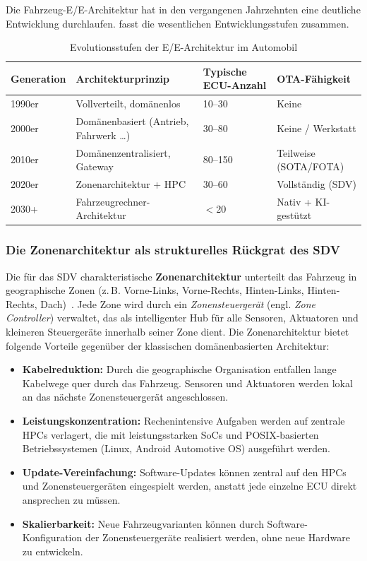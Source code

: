 ﻿\documentclass[12pt,a4paper,twoside]{article}
\begin{document}
Die Fahrzeug-E/E-Architektur hat in den vergangenen Jahrzehnten eine deutliche
Entwicklung durchlaufen.  fasst die wesentlichen
Entwicklungsstufen zusammen.

\begin{table}[htbp]
  \centering
  \caption{Evolutionsstufen der E/E-Architektur im Automobil}
  \label{tab:ee_evolution}
  \begin{tabularx}{\textwidth}{lXXX}
    \toprule
    \textbf{Generation} & \textbf{Architekturprinzip} & \textbf{Typische ECU-Anzahl}
      & \textbf{OTA-Fähigkeit} \\
    \midrule
    1990er & Vollverteilt, domänenlos & 10--30 & Keine \\
    2000er & Domänenbasiert (Antrieb, Fahrwerk \ldots) & 30--80 & Keine / Werkstatt \\
    2010er & Domänenzentralisiert, Gateway & 80--150 & Teilweise (SOTA/FOTA) \\
    2020er & Zonenarchitektur + HPC & 30--60 & Vollständig (SDV) \\
    2030+ & Fahrzeugrechner-Architektur & $<$20 & Nativ + KI-gestützt \\
    \bottomrule
  \end{tabularx}
\end{table}

\subsubsection{Die Zonenarchitektur als strukturelles Rückgrat des SDV}

Die für das SDV charakteristische \textbf{Zonenarchitektur} unterteilt das
Fahrzeug in geographische Zonen (z.\,B. Vorne-Links, Vorne-Rechts, Hinten-Links,
Hinten-Rechts, Dach)~\cite{schneider2026ladekomm}. Jede Zone wird durch ein
\emph{Zonensteuergerät} (engl. \textit{Zone Controller}) verwaltet, das als
intelligenter Hub für alle Sensoren, Aktuatoren und kleineren Steuergeräte
innerhalb seiner Zone dient. Die Zonenarchitektur bietet folgende Vorteile
gegenüber der klassischen domänenbasierten Architektur:

\begin{itemize}
  \item \textbf{Kabelreduktion:} Durch die geographische Organisation entfallen
    lange Kabelwege quer durch das Fahrzeug. Sensoren und Aktuatoren werden lokal
    an das nächste Zonensteuergerät angeschlossen.
  \item \textbf{Leistungskonzentration:} Rechenintensive Aufgaben werden auf
    zentrale HPCs verlagert, die mit leistungsstarken SoCs und POSIX-basierten
    Betriebssystemen (Linux, Android Automotive OS) ausgeführt werden.
  \item \textbf{Update-Vereinfachung:} Software-Updates können zentral auf den
    HPCs und Zonensteuergeräten eingespielt werden, anstatt jede einzelne ECU
    direkt ansprechen zu müssen.
  \item \textbf{Skalierbarkeit:} Neue Fahrzeugvarianten können durch Software-
    Konfiguration der Zonensteuergeräte realisiert werden, ohne neue Hardware zu
    entwickeln.
\end{itemize}
\end{document}
